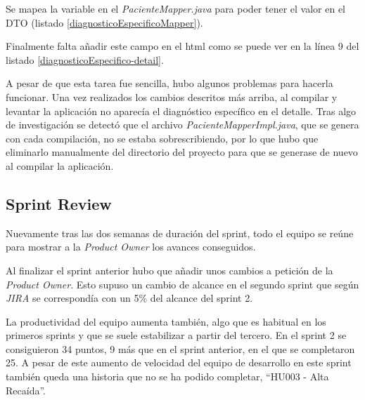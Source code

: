

Se mapea la variable en el \emph{PacienteMapper.java} para poder tener el valor en el DTO (listado \ref{diagnosticoEspecificoMapper}).



Finalmente falta añadir este campo en el html como se puede ver en la línea 9 del listado \ref{diagnosticoEspecifico-detail}.



A pesar de que esta tarea fue sencilla, hubo algunos problemas para hacerla funcionar. Una vez realizados los cambios descritos más arriba, al compilar y levantar la aplicación no aparecía el diagnóstico específico en el detalle. Tras algo de investigación se detectó que el archivo \emph{PacienteMapperImpl.java}, que se genera con cada compilación, no se estaba sobrescribiendo, por lo que hubo que eliminarlo manualmente del directorio del proyecto para que se generase de nuevo al compilar la aplicación.



\subsection{Sprint Review}
\label{subsec:S2-SR}

Nuevamente tras las dos semanas de duración del sprint, todo el equipo se reúne para mostrar a la \emph{Product Owner} los avances conseguidos.

Al finalizar el sprint anterior hubo que añadir unos cambios a petición de la \emph{Product Owner}. Esto supuso un cambio de alcance en el segundo sprint que según \emph{JIRA} se correspondía con un 5\% del alcance del sprint 2.

La productividad del equipo aumenta también, algo que es habitual en los primeros sprints y que se suele estabilizar a partir del tercero. En el sprint 2 se consiguieron 34 puntos, 9 más que en el sprint anterior, en el que se completaron 25. A pesar de este aumento de velocidad del equipo de desarrollo en este sprint también queda una historia que no se ha podido completar, ``HU003 - Alta Recaída''.

